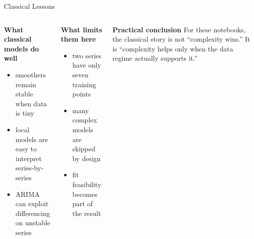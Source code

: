 \begin{frame}[t]{Classical Lessons}
  \vspace{0.4em}

  \begin{columns}[T,onlytextwidth]
    \begin{panelbox}
      \textbf{What classical models do well}
      \begin{itemize}
        \item smoothers remain stable when data is tiny
        \item local models are easy to interpret series-by-series
        \item ARIMA can exploit differencing on unstable series
      \end{itemize}
    \end{panelbox}

    \begin{panelbox}
      \textbf{What limits them here}
      \begin{itemize}
        \item two series have only seven training points
        \item many complex models are skipped by design
        \item fit feasibility becomes part of the result
      \end{itemize}
    \end{panelbox}

    \begin{panelbox}
      \textbf{Practical conclusion}
      For these notebooks, the classical story is not “complexity wins.” It is “complexity helps only when the data regime actually supports it.”
    \end{panelbox}
  \end{columns}
\end{frame}
